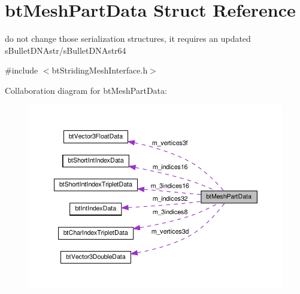 \hypertarget{structbtMeshPartData}{}\section{bt\+Mesh\+Part\+Data Struct Reference}
\label{structbtMeshPartData}


do not change those serialization structures, it requires an updated s\+Bullet\+D\+N\+Astr/s\+Bullet\+D\+N\+Astr64  




{\ttfamily \#include $<$bt\+Striding\+Mesh\+Interface.\+h$>$}



Collaboration diagram for bt\+Mesh\+Part\+Data\+:
\nopagebreak
\begin{figure}[H]
\begin{center}
\leavevmode
\includegraphics[width=350pt]{structbtMeshPartData__coll__graph}
\end{center}
\end{figure}
